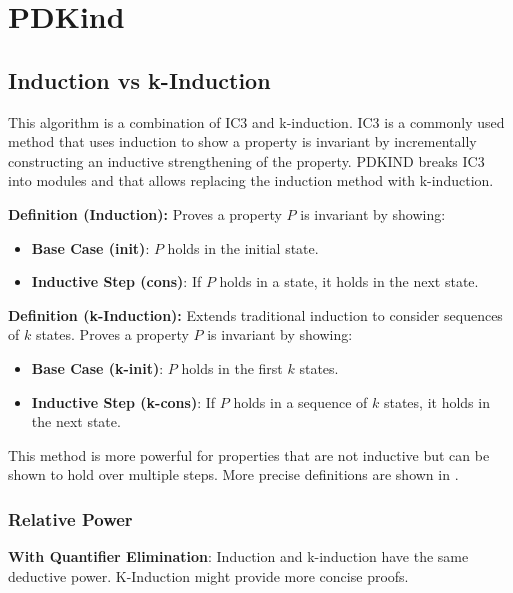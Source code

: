 \chapter{PDKind}


\section{Induction vs k-Induction}

\noindent This algorithm is a combination of IC3 and k-induction.
IC3 is a commonly used method that uses induction to show a property is invariant by incrementally constructing an inductive strengthening of the property. PDKIND breaks IC3 into modules and that allows replacing the induction method with k-induction.


\vspace{\baselineskip}\noindent \textbf{Definition (Induction):} Proves a property \( P \) is invariant by showing:
\begin{itemize}
    \item \textbf{Base Case (init)}: \( P \) holds in the initial state.
    \item \textbf{Inductive Step (cons)}: If \( P \) holds in a state, it holds in the next state.
\end{itemize}


\vspace{\baselineskip}\noindent \textbf{Definition (k-Induction):} Extends traditional induction to consider sequences of \( k \) states. Proves a property \( P \) is invariant by showing:
\begin{itemize}
    \item \textbf{Base Case (k-init)}: \( P \) holds in the first \( k \) states.
    \item \textbf{Inductive Step (k-cons)}: If \( P \) holds in a sequence of \( k \) states, it holds in the next state.
\end{itemize}

This method is more powerful for properties that are not inductive but can be shown to hold over multiple steps.
More precise definitions are shown in \cite{7886665}.

\subsection*{Relative Power}
\noindent    \textbf{With Quantifier Elimination}:
        Induction and k-induction have the same deductive power. K-Induction might provide more concise proofs.

